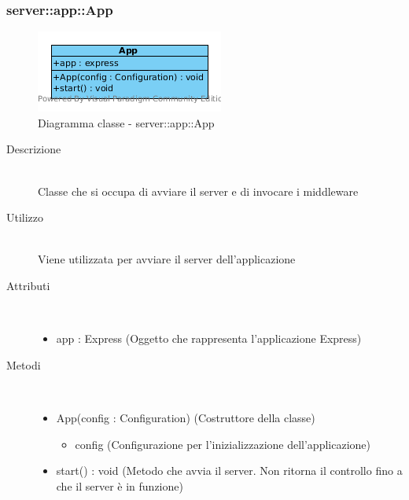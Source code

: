 \subsubsection[App]{server::app::App}
\begin{center}
			\begin{figure}[H]
				\centering \includegraphics[scale=4, max width=\textwidth, max height=\myheight]{../img/diagrammiClassi/server/app/App.png}
				\caption{Diagramma classe - server::app::App}
			\end{figure}
		\end{center}\begin{description}
\item[Descrizione] \hfill \\
 Classe che si occupa di avviare il server e di invocare i middleware
\item[Utilizzo] \hfill \\
 Viene utilizzata per avviare il server dell'applicazione
\item[Attributi] \hfill \\
 \vspace{-7mm}
\begin{itemize}
\item app : Express (Oggetto che rappresenta l'applicazione Express)
\end{itemize}

\item[Metodi] \hfill \\
 \vspace{-7mm}
\begin{itemize}
\item App(config : Configuration) (Costruttore della classe)\begin{itemize}
\item config (Configurazione per l'inizializzazione dell'applicazione)
\end{itemize}

\item start() : void (Metodo che avvia il server. Non ritorna il controllo fino a che il server è in funzione)
\end{itemize}

\end{description}

